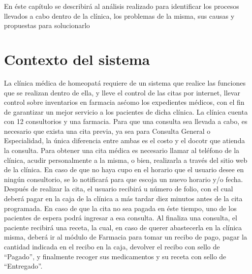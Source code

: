 En \'este cap\'itulo se describir\'a al an\'alisis realizado para identificar los procesos llevados a cabo dentro de la cl\'inica, los problemas de la misma, sus causas y propuestas para solucionarlo

\section{Contexto del sistema}

	La cl\'inica m\'edica de homeopat\'a requiere de un sistema que realice las funciones que se realizan dentro de ella, y lleve el control de las citas por internet, llevar control sobre inventarios en farmacia as\' como los expedientes m\'edicos, con el fin de garantizar un mejor servicio a los pacientes de dicha cl\'inica.
La cl\'inica cuenta con 12 consultorios y una farmacia. Para que una consulta sea llevada a cabo, es necesario
que exista una cita previa, ya sea para Consulta General o Especialidad, la \'unica diferencia entre ambas es el costo y el docotr que atienda la consulta.
Para obtener una cita m\'edica es necesario llamar al tel\'efono de la cl\'inica, acudir personalmente a la misma, o bien, realizarla a trav\'es del sitio web de la cl\'inica. En caso de que no haya cupo en el horario que el usuario desee en ning\'un consultorio, se lo notificar\'a para que escoja un nuevo horario y/o fecha. Despu\'es de realizar la cita, el usuario recibir\'a u n\'umero de folio, con el cual deber\'a pagar en la caja de la cl\'inica a m\'as tardar diez minutos antes de la cita programada. En caso de que la cita no sea pagada en \'este tiempo, uno de los pacientes de espera podr\'a ingresar a esa consulta.
Al finaliza una consulta, el paciente recibir\'a una receta, la cual, en caso de querer abastecerla en la cl\'inica misma, deber\'a ir al m\'odulo de Farmacia para tomar un recibo de pago, pagar la cantidad indicada en el recibo en la caja, devolver el recibo con sello de "`Pagado"', y finalmente recoger sus medicamentos y su receta con sello de "`Entregado"'.


